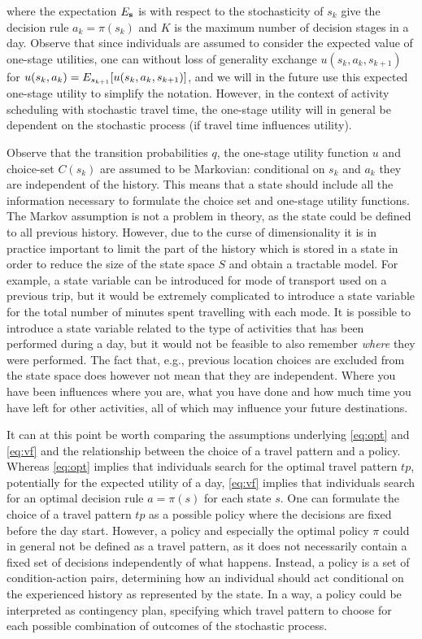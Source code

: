 where the expectation $E_{\mathbf{s}}$ is with respect to the stochasticity of $s_k$ give the decision rule $a_k=\pi({s_k})$ and $K$ is the maximum number of decision stages in a day. Observe that since individuals are assumed to consider the expected value of one-stage utilities, one can without loss of generality exchange $u(s_k,a_k,s_{k+1})$ for $u(s_k,a_k) = E_{s_{k+1}}[u(s_k,a_k,s_{k+1})]$, and we will in the future use this expected one-stage utility to simplify the notation. However, in the context of activity scheduling with stochastic travel time, the one-stage utility will in general be dependent on the stochastic process (if travel time influences utility).

Observe that the transition probabilities $q$, the one-stage utility function $u$ and choice-set $C(s_k)$ are assumed to be Markovian: conditional on $s_k$ and $a_k$ they are independent of the history. This means that a state should include all the information necessary to formulate the choice set and one-stage utility functions. The Markov assumption is not a problem in theory, as the state could be defined to all previous history. However, due to the curse of dimensionality it is in practice important to limit the part of the history which is stored in a state in order to reduce the size of the state space $S$ and obtain a tractable model. For example, a state variable can be introduced for mode of transport used on a previous trip, but it would be extremely complicated to introduce a state variable for the total number of minutes spent travelling with each mode. It is possible to introduce a state variable related to the type of activities that has been performed during a day, but it would not be feasible to also remember \emph{where} they were performed. The fact that, e.g., previous location choices are excluded from the state space does however not mean that they are independent. Where you have been influences where you are, what you have done and how much time you have left for other activities, all of which may influence your future destinations. 

It can at this point be worth comparing the assumptions underlying \eqref{eq:opt} and \eqref{eq:vf} and the relationship between the choice of a travel pattern and a policy. Whereas \eqref{eq:opt} implies that individuals search for the optimal travel pattern $tp$, potentially for the expected utility of a day, \eqref{eq:vf} implies that individuals search for an optimal decision rule $a = \pi(s)$ for each state $s$. One can formulate the choice of a travel pattern $tp$ as a possible policy where the decisions are fixed before the day start. However, a policy and especially the optimal policy $\pi$ could in general not be defined as a travel pattern, as it does not necessarily contain a fixed set of decisions independently of what happens. Instead, a policy is a set of condition-action pairs, determining how an individual should act conditional on the experienced history as represented by the state. In a way, a policy could be interpreted as contingency plan, specifying which travel pattern to choose for each possible combination of outcomes of the stochastic process.


